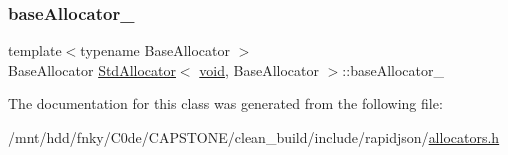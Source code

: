 \subsubsection{\texorpdfstring{base\+Allocator\+\_\+}{baseAllocator\_}}
{\footnotesize\ttfamily template$<$typename Base\+Allocator $>$ \\
Base\+Allocator \hyperlink{classStdAllocator}{Std\+Allocator}$<$ \hyperlink{imgui__impl__opengl3__loader_8h_ac668e7cffd9e2e9cfee428b9b2f34fa7}{void}, Base\+Allocator $>$\+::base\+Allocator\+\_\+\hspace{0.3cm}{\ttfamily [private]}}



The documentation for this class was generated from the following file\+:\begin{DoxyCompactItemize}
\item 
/mnt/hdd/fnky/\+C0de/\+C\+A\+P\+S\+T\+O\+N\+E/clean\+\_\+build/include/rapidjson/\hyperlink{allocators_8h}{allocators.\+h}\end{DoxyCompactItemize}
